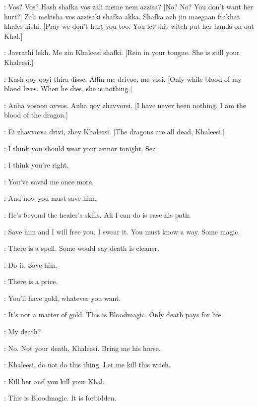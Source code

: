 \QOTHO: Vos? Vos? Hash shafka vos zali meme nem azzisa? [No? No? You don't want her hurt?] Zali mekisha vos azzisaki shafka akka. Shafka azh jin maegaan frakhat khales kishi. [Pray we don't hurt you too. You let this witch put her hands on out Khal.] 

\JORAH: Javrathi lekh. Me zin Khaleesi shafki. [Rein in your tongue. She is still your Khaleesi.] 

\QOTHO: Kash qoy qoyi thira disse. Affin me drivoe, me vosi. [Only while blood of my blood lives. When he dies, she is nothing.] 

\DAENERYS: Anha vosoon avvos. Anha qoy zhavvorsi. [I have never been nothing. I am the blood of the dragon.] 

\QOTHO: Ei zhavvorsa drivi, zhey Khaleesi. [The dragons are all dead, Khaleesi.] 


\DAENERYS: I think you should wear your armor tonight, Ser. 

\JORAH: I think you're right. 


\MIRRI: You've saved me once more. 

\DAENERYS: And now you must save him. 

\MIRRI: He's beyond the healer's skills. All I can do is ease his path. 

\DAENERYS: Save him and I will free you. I swear it. You must know a way. Some magic. 

\MIRRI: There is a spell. Some would say death is cleaner. 

\DAENERYS: Do it. Save him. 

\MIRRI: There is a price. 

\DAENERYS: You'll have gold, whatever you want. 

\MIRRI: It's not a matter of gold. This is Bloodmagic. Only death pays for life. 

\DAENERYS: My death? 

\MIRRI: No. Not your death, Khaleesi. Bring me his horse. 


\RAKHARO: Khaleesi, do not do this thing. Let me kill this witch. 

\DAENERYS: Kill her and you kill your Khal. 

\RAKHARO: This is Bloodmagic. It is forbidden. 


